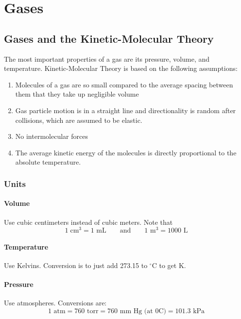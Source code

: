 \documentclass[../GChemReview.tex]{subfiles}
\begin{document}
	\chapter{Gases}
	
	\section{Gases and the Kinetic-Molecular Theory}
	
	The most important properties of a gas are its pressure, volume, and temperature. Kinetic-Molecular Theory is based on the following assumptions:
	\begin{enumerate}
		\item Molecules of a gas are so small compared to the average spacing between them that they take up negligible volume
		\item Gas particle motion is in a straight line and directionality is random after collisions, which are assumed to be elastic.
		\item No intermolecular forces
		\item The average kinetic energy of the molecules is directly proportional to the absolute temperature. 
	\end{enumerate}
	
	\subsection{Units}
	
	\subsubsection{Volume}
	
	Use cubic centimeters instead of cubic meters. Note that 
	\[ \boxed{1 \; \text{cm}^{3} = 1 \text{ mL} \qquad \text{and} \qquad 1 \text{ m}^{3} = 1000 \text{ L}} \]
	
	\subsubsection{Temperature}
	
	Use Kelvins. Conversion is to just add 273.15 to $ ^{\circ} $C to get K.
	
	\subsubsection{Pressure}
	
	Use atmospheres. Conversions are:
	\[ 1 \text{ atm} = 760 \text{ torr} = 760 \text{ mm Hg (at 0C)} = 101.3 \text{ kPa} \]
	
\end{document}
